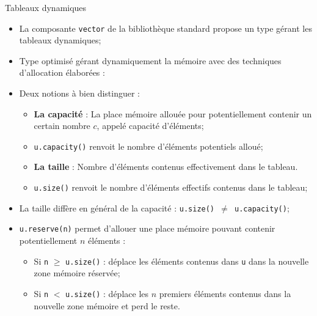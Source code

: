 \documentclass[compress,10pt,aspectratio=169]{beamer}
\begin{document}
\begin{frame}[fragile]{Tableaux dynamiques}
\scriptsize
\begin{itemize}
\item La composante \texttt{vector} de la bibliothèque standard propose un type gérant les tableaux dynamiques;
\item Type optimisé gérant dynamiquement la mémoire avec des techniques d'allocation élaborées :
\item Deux notions à bien distinguer :
\begin{itemize}
\scriptsize
\item \textbf{La capacité} : La place mémoire allouée pour potentiellement contenir un certain nombre $c$, appelé capacité d'éléments;
\item \texttt{u.capacity()} renvoit le nombre d'éléments potentiels alloué;
\item \textbf{La taille} : Nombre d'éléments contenus effectivement dans le tableau.
\item \texttt{u.size()} renvoit le nombre d'éléments effectifs contenus dans le tableau;
\end{itemize}
\item La taille diffère en général de la capacité : \texttt{u.size() $\neq$ u.capacity()};
\item \texttt{u.reserve(n)} permet d'allouer une place mémoire pouvant contenir potentiellement $n$ éléments :
\begin{itemize}
\scriptsize 
\item Si \texttt{n} $\ge$ \texttt{u.size()} : déplace les éléments contenus dans \texttt{u} dans la nouvelle zone mémoire réservée;
\item Si \texttt{n} $<$ \texttt{u.size()} : déplace les $n$ premiers éléments contenus dans la nouvelle zone mémoire et perd le reste.
\end{itemize}
\end{itemize}
\end{frame}
\end{document}
